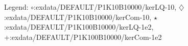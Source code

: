 Legend: {\color{CornflowerBlue}$\circ$}:exdata/DEFAULT/P1K10B10000/kerLQ-10, {\color{Orange}$\diamondsuit$}:exdata/DEFAULT/P1K10B10000/kerCom-10, {\color{Green}$\star$}:exdata/DEFAULT/P1K100B10000/kerLQ-1e2, {\color{red}+}:exdata/DEFAULT/P1K100B10000/kerCom-1e2